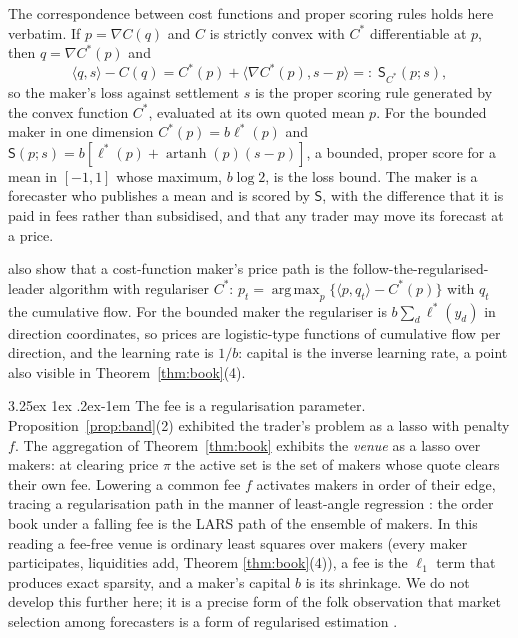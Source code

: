 \documentclass[11pt]{article}
\makeatletter
\renewcommand\paragraph{\@startsection{paragraph}{4}{\z@}%
  {3.25ex \@plus1ex \@minus.2ex}{-1em}%
  {\normalfont\normalsize\itshape}}
\theoremstyle{definition}
\theoremstyle{remark}
\newcommand{\ip}[2]{\langle #1,#2\rangle}
\newcommand{\lcs}{\ell^{*}}
\newcommand{\artanh}{\operatorname{artanh}}
\DeclareMathOperator*{\argmax}{arg\,max}
\makeatother
\begin{document}
The correspondence between cost functions and proper scoring rules \citep{hanson2003,chen2007utility,abernethy2013}
holds here verbatim. If $p=\nabla C(q)$ and $C$ is strictly convex with $C^{*}$ differentiable at $p$, then
$q=\nabla C^{*}(p)$ and
\begin{equation}\label{eq:bregman}
\ip{q}{s}-C(q)=C^{*}(p)+\ip{\nabla C^{*}(p)}{s-p}=:\;\mathsf{S}_{C^{*}}(p;s),
\end{equation}
so the maker's loss against settlement $s$ is the proper scoring rule generated by the convex function $C^{*}$,
evaluated at its own quoted mean $p$. For the bounded maker in one dimension $C^{*}(p)=b\lcs(p)$ and
$\mathsf{S}(p;s)=b[\lcs(p)+\artanh(p)(s-p)]$, a bounded, proper score for a mean in $[-1,1]$ whose maximum,
$b\log2$, is the loss bound. The maker is a forecaster who publishes a mean and is scored by $\mathsf{S}$, with the
difference that it is paid in fees rather than subsidised, and that any trader may move its forecast at a price.

\citet{abernethy2013} also show that a cost-function maker's price path is the follow-the-regularised-leader
algorithm with regulariser $C^{*}$: $p_t=\argmax_p\{\ip{p}{q_t}-C^{*}(p)\}$ with $q_t$ the cumulative flow. For the
bounded maker the regulariser is $b\sum_d\lcs(y_d)$ in direction coordinates, so prices are logistic-type functions
of cumulative flow per direction, and the learning rate is $1/b$: capital is the inverse learning rate, a point also
visible in Theorem~\ref{thm:book}(4).

\paragraph{The fee is a regularisation parameter.} Proposition~\ref{prop:band}(2) exhibited the trader's problem as a
lasso with penalty $f$. The aggregation of Theorem~\ref{thm:book} exhibits the \emph{venue} as a lasso over makers:
at clearing price $\pi$ the active set is the set of makers whose quote clears their own fee. Lowering a common fee
$f$ activates makers in order of their edge, tracing a regularisation path in the manner of least-angle regression
\citep{efron2004}: the order book under a falling fee is the LARS path of the ensemble of makers. In this reading
a fee-free venue is ordinary least squares over makers (every maker participates, liquidities add, Theorem
\ref{thm:book}(4)), a fee is the $\ell_1$ term that produces exact sparsity, and a maker's capital $b$ is its
shrinkage. We do not develop this further here; it is a precise form of the folk observation that market
selection among forecasters is a form of regularised estimation \citep{blume1992,chen2010}.
\end{document}
